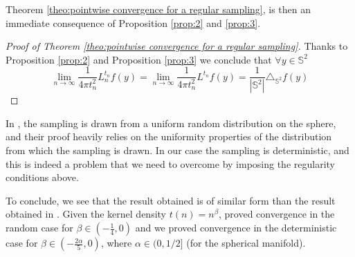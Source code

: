 \documentclass{article} %
\renewcommand{\S}{\mathbb{S}}
\newcommand{\nati}[1]{{\color[rgb]{.3,.5,.9}{#1}}}
\newcommand{\linefrac}[2]{
    {#1/#2}
}
\begin{document}
Theorem \ref{theo:pointwise convergence for a regular sampling}, is then an immediate consequence of Proposition \ref{prop:2} and \ref{prop:3}.
\begin{proof}[Proof of Theorem \ref{theo:pointwise convergence for a regular sampling}]
	Thanks to Proposition \ref{prop:2} and Proposition \ref{prop:3}	we conclude that $\forall y\in\S^2 $
	\begin{equation*}
	\lim_{n\to\infty}\frac{1}{4\pi t_n^2} L_n^{t_n}f(y) =  \lim_{n\to\infty}\frac{1}{4\pi t_n^2} L^{t_n}f(y) = \frac{1}{|\S^2|}\triangle_{\S^2}f(y)
	\end{equation*}
\end{proof}



In \citep{belkin2005towards}, the sampling is drawn from a uniform random distribution on the sphere, and their proof heavily relies on the uniformity properties of the distribution from which the sampling is drawn. In our case the sampling is deterministic, and this is indeed a problem that we need to overcome by imposing the regularity conditions above.

To conclude, we see that the result obtained is of similar form than the result obtained in \citep{belkin2005towards}. Given the kernel density $t(n)=n^\beta$, \citet{belkin2005towards} proved convergence in the random case for $\beta \in (-\frac{1}{4}, 0)$ and we proved convergence in the deterministic case for $\beta \in (-\frac{2\alpha}{5}, 0)$, where $\alpha \in (0, \linefrac{1}{2}]$ (for the spherical manifold).
\end{document}
